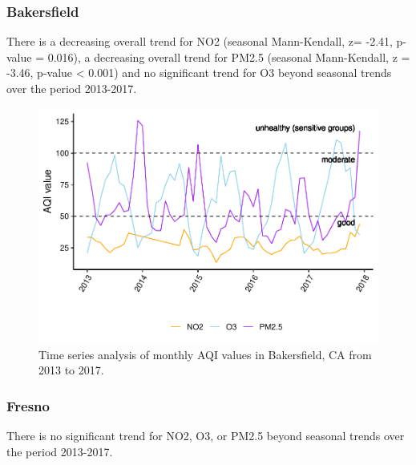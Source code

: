 \documentclass[12pt,]{article}
\begin{document}
\newpage

\hypertarget{bakersfield}{%
\subsubsection{Bakersfield}\label{bakersfield}}

There is a decreasing overall trend for NO2 (seasonal Mann-Kendall, z=
-2.41, p-value = 0.016), a decreasing overall trend for PM2.5 (seasonal
Mann-Kendall, z = -3.46, p-value \textless{} 0.001) and no significant
trend for O3 beyond seasonal trends over the period 2013-2017.

\begin{figure}
\centering
\includegraphics{FinalProject_AliciaZhao_files/figure-latex/unnamed-chunk-17-1.pdf}
\caption{Time series analysis of monthly AQI values in Bakersfield, CA
from 2013 to 2017.}
\end{figure}

\newpage

\hypertarget{fresno}{%
\subsubsection{Fresno}\label{fresno}}

There is no significant trend for NO2, O3, or PM2.5 beyond seasonal
trends over the period 2013-2017.
\end{document}
